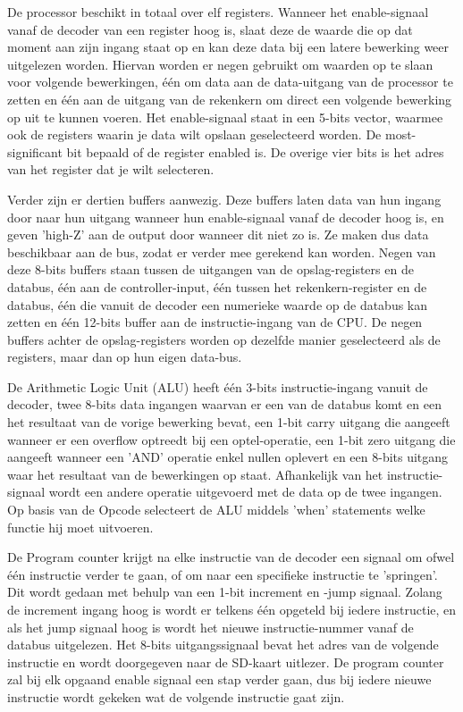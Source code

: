 \documentclass[oneside,dutch]{tudelft-report}
\begin{document}
De processor beschikt in totaal over elf registers. Wanneer het enable-signaal vanaf de decoder van een register hoog is, slaat deze de waarde die op dat moment aan zijn ingang staat op en kan deze data bij een latere bewerking weer uitgelezen worden. Hiervan worden er negen gebruikt om waarden op te slaan voor volgende bewerkingen, één om data aan de data-uitgang van de processor te zetten en één aan de uitgang van de rekenkern om direct een volgende bewerking op uit te kunnen voeren. Het enable-signaal staat in een 5-bits vector, waarmee ook de registers waarin je data wilt opslaan geselecteerd worden. De most-significant bit bepaald of de register enabled is. De overige vier bits is het adres van het register dat je wilt selecteren.

Verder zijn er dertien buffers aanwezig. Deze buffers laten data van hun ingang door naar hun uitgang wanneer hun enable-signaal vanaf de decoder hoog is, en geven 'high-Z' aan de output door wanneer dit niet zo is. Ze maken dus data beschikbaar aan de bus, zodat er verder mee gerekend kan worden. Negen van deze 8-bits buffers staan tussen de uitgangen van de opslag-registers en de databus, één aan de controller-input, één tussen het rekenkern-register en de databus, één die vanuit de decoder een numerieke waarde op de databus kan zetten en één 12-bits buffer aan de instructie-ingang van de CPU. De negen buffers achter de opslag-registers worden op dezelfde manier geselecteerd als de registers, maar dan op hun eigen data-bus.

De Arithmetic Logic Unit (ALU) heeft één 3-bits instructie-ingang vanuit de decoder, twee 8-bits data ingangen waarvan er een van de databus komt en een het resultaat van de vorige bewerking bevat, een 1-bit carry uitgang die aangeeft wanneer er een overflow optreedt bij een optel-operatie, een 1-bit zero uitgang die aangeeft wanneer een 'AND' operatie enkel nullen oplevert en een 8-bits uitgang waar het resultaat van de bewerkingen op staat. Afhankelijk van het instructie-signaal wordt een andere operatie uitgevoerd met de data op de twee ingangen.
Op basis van de Opcode selecteert de ALU middels 'when' statements welke functie hij moet uitvoeren.

De Program counter krijgt na elke instructie van de decoder een signaal om ofwel één instructie verder te gaan, of om naar een specifieke instructie te 'springen'. Dit wordt gedaan met behulp van een 1-bit increment en -jump signaal. Zolang de increment ingang hoog is wordt er telkens één opgeteld bij iedere instructie, en als het jump signaal hoog is wordt het nieuwe instructie-nummer vanaf de databus uitgelezen. Het 8-bits uitgangssignaal bevat het adres van de volgende instructie en wordt doorgegeven naar de SD-kaart uitlezer. De program counter zal bij elk opgaand enable signaal een stap verder gaan, dus bij iedere nieuwe instructie wordt gekeken wat de volgende instructie gaat zijn.
\end{document}
